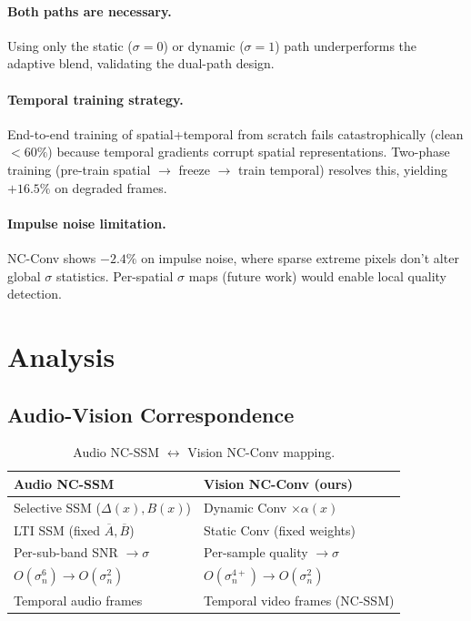 \documentclass[10pt,twocolumn,letterpaper]{article}
\begin{document}
\paragraph{Both paths are necessary.}
Using only the static ($\sigma{=}0$) or dynamic ($\sigma{=}1$) path underperforms the adaptive blend, validating the dual-path design.

\paragraph{Temporal training strategy.}
End-to-end training of spatial+temporal from scratch fails catastrophically (clean $< 60\%$) because temporal gradients corrupt spatial representations.
Two-phase training (pre-train spatial $\to$ freeze $\to$ train temporal) resolves this, yielding $+16.5\%$ on degraded frames.

\paragraph{Impulse noise limitation.}
NC-Conv shows $-2.4\%$ on impulse noise, where sparse extreme pixels don't alter global $\sigma$ statistics.
Per-spatial $\sigma$ maps (future work) would enable local quality detection.

\section{Analysis}
\label{sec:analysis}

\subsection{Audio-Vision Correspondence}

\begin{table}[t]
\centering
\caption{Audio NC-SSM $\leftrightarrow$ Vision NC-Conv mapping.}
\label{tab:mapping}
\footnotesize
\begin{tabular}{@{}ll@{}}
\toprule
\textbf{Audio NC-SSM}~\cite{choi2026ncssm} & \textbf{Vision NC-Conv (ours)} \\
\midrule
Selective SSM ($\Delta(x), B(x)$) & Dynamic Conv $\times \alpha(x)$ \\
LTI SSM (fixed $\overline{A}, \overline{B}$) & Static Conv (fixed weights) \\
Per-sub-band SNR $\to \sigma$ & Per-sample quality $\to \sigma$ \\
$O(\sigma_n^6) \to O(\sigma_n^2)$ & $O(\sigma_n^{4+}) \to O(\sigma_n^2)$ \\
Temporal audio frames & Temporal video frames (NC-SSM) \\
\bottomrule
\end{tabular}
\end{table}
\end{document}
